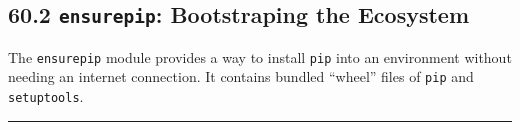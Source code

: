 \hypertarget{ensurepip-bootstraping-the-ecosystem}{%
\subsection{\texorpdfstring{60.2 \texttt{ensurepip}: Bootstraping the
Ecosystem}{60.2 ensurepip: Bootstraping the Ecosystem}}\label{ensurepip-bootstraping-the-ecosystem}}

The \passthrough{\lstinline!ensurepip!} module provides a way to install
\passthrough{\lstinline!pip!} into an environment without needing an
internet connection. It contains bundled ``wheel'' files of
\passthrough{\lstinline!pip!} and \passthrough{\lstinline!setuptools!}.

\begin{center}\rule{0.5\linewidth}{0.5pt}\end{center}
